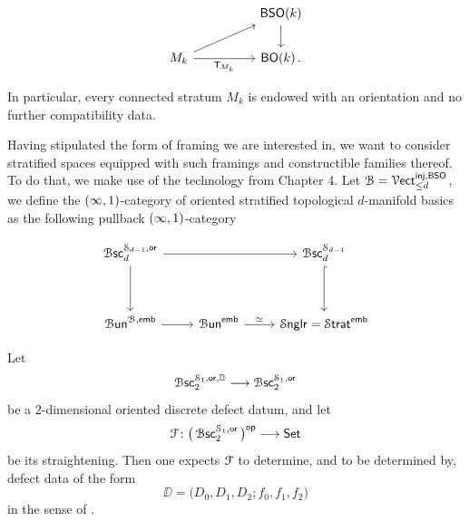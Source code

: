 \begin{construction}
\begin{equation}
    \begin{tikzcd}[ampersand replacement=\&]
        \&\& {\sB\sS\sO(k)} \\
        M_{k} \&\& {\sB\sO(k)} \, .
        \arrow[from=1-3, to=2-3]
        \arrow[from=2-1, to=1-3]
        \arrow["\sT_{M_{k}}"', from=2-1, to=2-3]
    \end{tikzcd}
\end{equation}

\smallskip

\nid In particular, every connected stratum $M_k$ is endowed with an orientation and no further compatibility data. 

\nid Having stipulated the form of framing we are interested in, we want to consider stratified spaces equipped with such framings and constructible families thereof. To do that, we make use of the technology from Chapter 4. Let $\mathcal B = \operatorname{\mathcal V{\sf ect}}^{\operatorname{\mathsf{inj}}, \mathsf B\mathsf S\mathsf O}_{\leq d}$, we define the $(\operatorname{\infty},1)$-category of oriented stratified topological $d$-manifold basics as the following pullback $(\operatorname{\infty},1)$-category

\begin{equation}
    \begin{tikzcd}[ampersand replacement=\&]
        {\Bsc_{d}^{\cS_{d-1}, \mathsf{or}}} \&\& {\Bsc^{\cS_{d-1}}_{d}} \\
        \\
        {\Bun^{\cB,\emb}} \& {\Bun^{\emb}} \& {\Snglr = \Strat^{\emb}} 
        \arrow[from=1-1, to=1-3]
        \arrow[from=1-1, to=3-1]
        \arrow[hook, from=1-3, to=3-3]
        \arrow[from=3-1, to=3-2]
        \arrow["\simeq", from=3-2, to=3-3]
    \end{tikzcd}
\end{equation}
\end{construction}


\begin{observation}
    Let \[
        \operatorname{\mathcal B\mathsf{sc}}_{2}^{\mathcal S_{1},\mathsf{or},\mathbb D} \longrightarrow \operatorname{\mathcal B\mathsf{sc}}_{2}^{\mathcal S_{1}, \mathsf{or}}
    \]
    be a $2$-dimensional oriented discrete defect datum, and let
    \begin{equation}
        \mathcal F \colon \big(\operatorname{\mathcal B\mathsf{sc}}_{2}^{\mathcal S_{1},\mathsf{or}}\big)^{\mathsf{op}} \longrightarrow \operatorname{{\mathsf{Set}}}
    \end{equation}
    be its straightening. Then one expects $\mathcal F$ to determine, and to be determined by, defect data of the form
    \begin{equation}
        \DD = \big(D_0,D_1,D_2;f_0,f_1,f_2\big)
    \end{equation}
    in the sense of \cite{CRS19}.
\end{observation}

